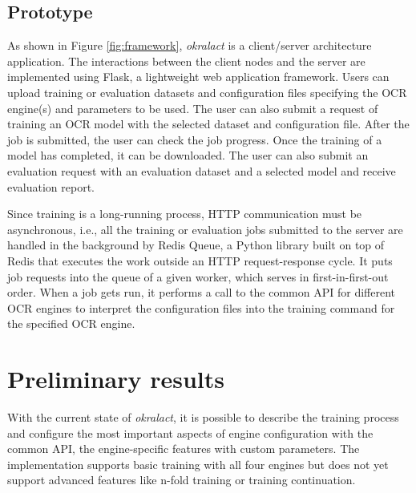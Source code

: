\documentclass[conference]{IEEEtran}
\begin{document}
\subsection{Prototype}
\label{sec:prototype}

As shown in Figure \ref{fig:framework}, \textit{okralact} is a client/server
architecture application. The interactions between the client nodes and the
server are implemented using Flask, a lightweight web application framework.
Users can upload training or evaluation datasets and configuration files
specifying the OCR engine(s) and parameters to be used. The user
can also submit a request of training an OCR model with the selected
dataset and configuration file. After the job is submitted, the
user can check the job progress. Once the training of a model has
completed, it can be downloaded. The user can also submit an
evaluation request with an evaluation dataset and a selected model
and receive evaluation report.


Since training is a long-running process, HTTP communication must be asynchronous,
i.e., all the training or evaluation
jobs submitted to the server are handled in the background by Redis Queue,
a Python library built on top of Redis that
executes the work outside an HTTP request-response cycle. It puts job
requests into the queue of a given worker, which serves in
first-in-first-out order. When a job gets run, it performs a call to the common
API for different OCR engines to interpret the configuration files into the
training command for the specified OCR engine.




\section{Preliminary results}

With the current state of \textit{okralact}, it is possible to describe the training process
and  configure the most important aspects of engine configuration with the common API, the 
engine-specific features with custom parameters. The implementation supports basic
training with all four engines but does not yet support advanced features like
n-fold training or training continuation.
\end{document}
